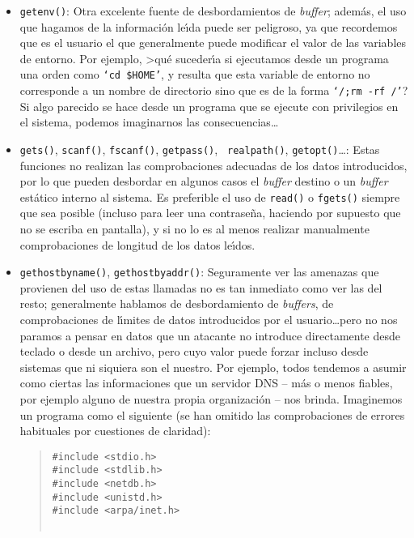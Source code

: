 \begin{itemize}
Estas funciones no comprueban la longitud de las cadenas con las que trabajan, 
por lo que son una gran fuente de {\it buffer overflows}. Se han de sustituir
por llamadas equivalentes que s\'{\i} realicen comprobaci\'on de l\'{\i}mites
({\tt strncpy()}, {\tt strncat()}\ldots) y, si no es posible, realizar dichas
comprobaciones manualmente.
\item {\tt getenv()}: Otra excelente fuente de desbordamientos de {\it buffer};
adem\'as, el uso que hagamos de la informaci\'on le\'{\i}da puede ser peligroso,
ya que recordemos que es el usuario el que generalmente puede modificar el valor
de las variables de entorno. Por ejemplo, >qu\'e suceder\'{\i}a si ejecutamos
desde un programa una orden como {\tt `cd \$HOME'}, y resulta que esta variable
de entorno no corresponde a un nombre de directorio sino que es de la forma
{\tt `/;rm -rf /'}? Si algo parecido se hace desde un programa que se ejecute
con privilegios en el sistema, podemos imaginarnos las consecuencias\ldots
\item {\tt gets()}, {\tt scanf()}, {\tt fscanf()}, {\tt getpass()}, {\tt 
realpath()}, {\tt getopt()}\ldots: Estas funciones no realizan las 
comprobaciones adecuadas de los datos introducidos, por lo que pueden desbordar
en algunos casos el {\it buffer} destino o un {\it buffer} est\'atico interno
al sistema. Es preferible el uso de {\tt read()} o {\tt fgets()} siempre que sea
posible (incluso para leer una contrase\~na, haciendo por supuesto que no se 
escriba en pantalla), y si no lo es al menos realizar manualmente comprobaciones
de longitud de los datos le\'{\i}dos. 
\item {\tt gethostbyname()}, {\tt gethostbyaddr()}: Seguramente ver las amenazas
que provienen del uso de estas llamadas no es tan inmediato como ver las del
resto; generalmente hablamos de desbordamiento de {\it buffers}, de 
comprobaciones de l\'{\i}mites de datos introducidos por el usuario\ldots pero
no nos paramos a pensar en datos que un atacante no introduce directamente 
desde teclado o desde un archivo, pero cuyo valor puede forzar incluso desde
sistemas que ni siquiera son el nuestro. Por ejemplo, todos tendemos a asumir
como ciertas las informaciones que un servidor DNS -- m\'as o menos fiables, por
ejemplo alguno de nuestra propia organizaci\'on -- nos brinda. Imaginemos un 
programa como
el siguiente (se han omitido las comprobaciones de errores habituales por 
cuestiones de claridad):
\begin{quote}
\begin{verbatim}
#include <stdio.h>
#include <stdlib.h>
#include <netdb.h>
#include <unistd.h>
#include <arpa/inet.h>


\end{verbatim}
\end{quote}
\end{itemize}
